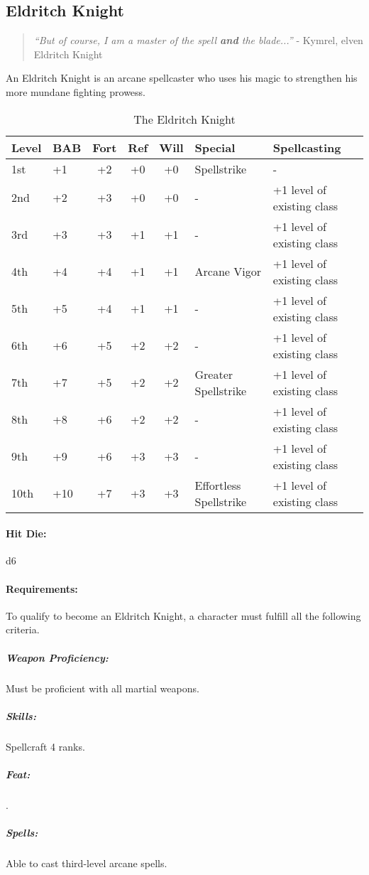 \subsection{Eldritch Knight}
\begin{quote}
\emph{``But of course, I am a master of the spell \textbf{and} the blade...''}
- Kymrel, elven Eldritch Knight
\end{quote}
An Eldritch Knight is an arcane spellcaster who uses his magic to strengthen his more mundane fighting prowess.

\begin{table*}
\centering
\caption{The Eldritch Knight}
\label{tab:EldritchKnight}
\begin{tabular}{llcccll}
\toprule
Level	&BAB	&Fort 	&Ref 	&Will 	&Special		&Spellcasting\\
\midrule
1st	&+1	&+2	&+0	&+0	&Spellstrike		&-\\
2nd	&+2	&+3	&+0	&+0	&-			&+1 level of existing class\\
3rd	&+3	&+3	&+1	&+1	&-			&+1 level of existing class\\
4th	&+4	&+4	&+1	&+1	&Arcane Vigor		&+1 level of existing class\\
5th	&+5	&+4	&+1	&+1	&-			&+1 level of existing class\\
6th	&+6	&+5	&+2	&+2	&-			&+1 level of existing class\\
7th	&+7	&+5	&+2	&+2	&Greater Spellstrike	&+1 level of existing class\\
8th	&+8	&+6	&+2	&+2	&-			&+1 level of existing class\\
9th	&+9	&+6	&+3	&+3	&-			&+1 level of existing class\\
10th	&+10	&+7	&+3	&+3	&Effortless Spellstrike	&+1 level of existing class\\
\bottomrule
\end{tabular}
\end{table*}

\paragraph{Hit Die:} d6
\paragraph{Requirements:}
To qualify to become an Eldritch Knight, a character must fulfill all the following criteria.
\subparagraph{Weapon Proficiency:} Must be proficient with all martial weapons.
\subparagraph{Skills:} Spellcraft 4 ranks.
\subparagraph{Feat:} .
\subparagraph{Spells:} Able to cast third-level arcane spells.

